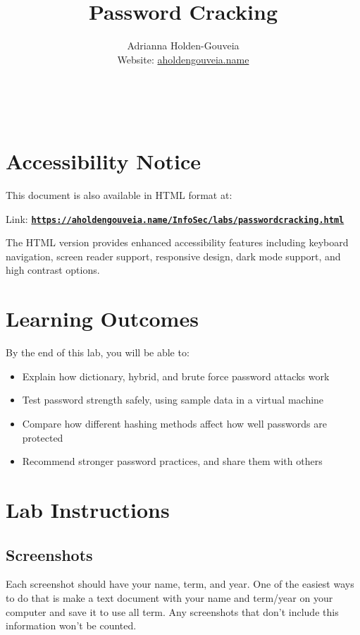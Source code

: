 \documentclass[12pt]{article}
\title{Password Cracking}
\author{
        Adrianna Holden-Gouveia \\
        Website: \href{https://aholdengouveia.name}{aholdengouveia.name}\\ 
        \date{\vspace{-5ex}}
        \faGithub {: aholdengouveia} \\
        \faTwitter {: aholdengouveia} \\
        }
\begin{document}
    

\maketitle

\section*{Accessibility Notice}
This document is also available in HTML format at:

Link: \href{https://aholdengouveia.name/InfoSec/labs/passwordcracking.html}{\textbf{\nolinkurl{https://aholdengouveia.name/InfoSec/labs/passwordcracking.html}}}

The HTML version provides enhanced accessibility features including keyboard navigation, screen reader support, responsive design, dark mode support, and high contrast options.



\section*{Learning Outcomes}
By the end of this lab, you will be able to:
\begin{itemize}
    \item Explain how dictionary, hybrid, and brute force password attacks work
    \item Test password strength safely, using sample data in a virtual machine
    \item Compare how different hashing methods affect how well passwords are protected
    \item Recommend stronger password practices, and share them with others
\end{itemize}
\section*{Lab Instructions}

\subsection*{Screenshots}
Each screenshot should have your name, term, and year.  One of the easiest ways to do that is make a text document with your name and term/year on your computer and save it to use all term. Any screenshots that don't include this information won't be counted.
\end{document}
